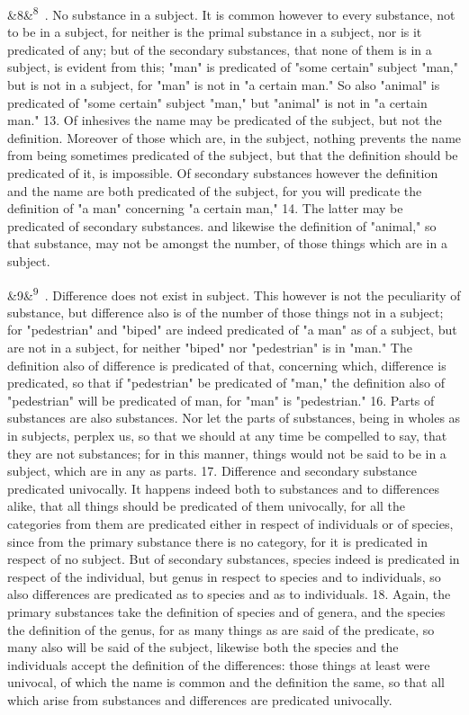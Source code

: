 \documentclass[12pt]{article}
\newcommand{\para}[1][]{\par\noindent\ifx&#1&\else\textsuperscript{\footnotesize #1}~\fi}
\begin{document}
\para[8] 12. No substance in a subject. It is common however to every substance, not to be in a subject, for neither is the primal substance in a subject, nor is it predicated of any; but of the secondary substances, that none of them is in a subject, is evident from this; "man" is predicated of "some certain" subject "man," but is not in a subject, for "man" is not in "a certain man." So also "animal" is predicated of "some certain" subject "man," but "animal" is not in "a certain man." 13. Of inhesives the name may be predicated of the subject, but not the definition. Moreover of those which are, in the subject, nothing prevents the name from being sometimes predicated of the subject, but that the definition should be predicated of it, is impossible. Of secondary substances however the definition and the name are both predicated of the subject, for you will predicate the definition of "a man" concerning "a certain man," 14. The latter may be predicated of secondary substances. and likewise the definition of "animal," so that substance, may not be amongst the number, of those things which are in a subject.

\para[9] 15. Difference does not exist in subject. This however is not the peculiarity of substance, but difference also is of the number of those things not in a subject; for "pedestrian" and "biped" are indeed predicated of "a man" as of a subject, but are not in a subject, for neither "biped" nor "pedestrian" is in "man." The definition also of difference is predicated of that, concerning which, difference is predicated, so that if "pedestrian" be predicated of "man," the definition also of "pedestrian" will be predicated of man, for "man" is "pedestrian." 16. Parts of substances are also substances. Nor let the parts of substances, being in wholes as in subjects, perplex us, so that we should at any time be compelled to say, that they are not substances; for in this manner, things would not be said to be in a subject, which are in any as parts. 17. Difference and secondary substance predicated univocally. It happens indeed both to substances and to differences alike, that all things should be predicated of them univocally, for all the categories from them are predicated either in respect of individuals or of species, since from the primary substance there is no category, for it is predicated in respect of no subject. But of secondary substances, species indeed is predicated in respect of the individual, but genus in respect to species and to individuals, so also differences are predicated as to species and as to individuals. 18. Again, the primary substances take the definition of species and of genera, and the species the definition of the genus, for as many things as are said of the predicate, so many also will be said of the subject, likewise both the species and the individuals accept the definition of the differences: those things at least were univocal, of which the name is common and the definition the same, so that all which arise from substances and differences are predicated univocally.
\end{document}
